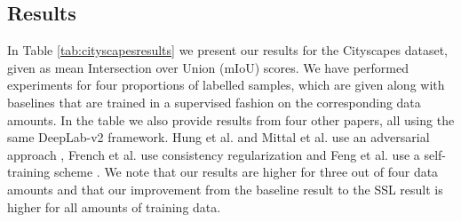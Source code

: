 \documentclass[10pt,twocolumn,letterpaper]{article}
\begin{document}
\subsection{Results}
\label{subsec:results}

In Table \ref{tab:cityscapesresults} we present our results for the Cityscapes dataset, given as mean Intersection over Union (mIoU) scores. We have performed experiments for four proportions of labelled samples, which are given along with baselines that are trained in a supervised fashion on the corresponding data amounts. In the table we also provide results from four other papers, all using the same DeepLab-v2 framework. Hung et al. and Mittal et al. use an adversarial approach \cite{Hung, Mittal}, French et al. use consistency regularization \cite{French} and Feng et al. use a self-training scheme \cite{Feng}. We note that our results are higher for three out of four data amounts and that our improvement from the baseline result to the SSL result is higher for all amounts of training data.
\end{document}
